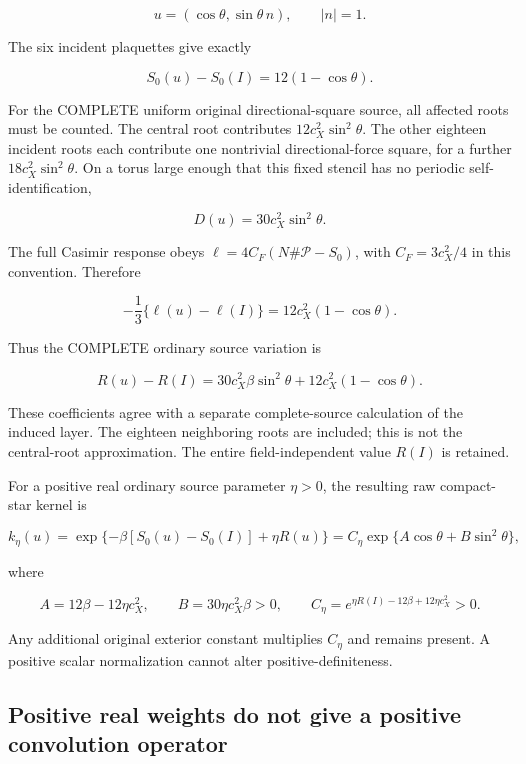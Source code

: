 \documentclass[
  11pt,
]{article}
\begin{document}
\[
 u=(\cos\theta,\sin\theta\,n),\qquad |n|=1.
\]

The six incident plaquettes give exactly

\[
 S_0(u)-S_0(I)=12(1-\cos\theta).
 \tag{T1}
\]

For the COMPLETE uniform original directional-square source, all
affected roots must be counted. The central root contributes
\(12c_X^2\sin^2\theta\). The other eighteen incident roots each
contribute one nontrivial directional-force square, for a further
\(18c_X^2\sin^2\theta\). On a torus large enough that this fixed stencil
has no periodic self-identification,

\[
 D(u)=30c_X^2\sin^2\theta.
 \tag{T2}
\]

The full Casimir response obeys \(\ell=4C_F(N\#\mathcal P-S_0)\), with
\(C_F=3c_X^2/4\) in this convention. Therefore

\[
 -\frac13\{\ell(u)-\ell(I)\}
 =12c_X^2(1-\cos\theta).
 \tag{T3}
\]

Thus the COMPLETE ordinary source variation is

\[
 R(u)-R(I)
 =30c_X^2\beta\sin^2\theta
   +12c_X^2(1-\cos\theta).
 \tag{T4}
\]

These coefficients agree with a separate
complete-source calculation of the induced layer. The eighteen
neighboring roots are included; this is not the central-root
approximation. The entire field-independent value \(R(I)\) is retained.

For a positive real ordinary source parameter \(\eta>0\), the resulting
raw compact-star kernel is

\[
 k_\eta(u)
 =\exp\{-\beta[S_0(u)-S_0(I)]+\eta R(u)\}
 =C_\eta\exp\{A\cos\theta+B\sin^2\theta\},
 \tag{T5}
\]

where

\[
 A=12\beta-12\eta c_X^2,
 \qquad B=30\eta c_X^2\beta>0,
 \qquad C_\eta=e^{\eta R(I)-12\beta+12\eta c_X^2}>0.
 \tag{T6}
\]

Any additional original exterior constant multiplies \(C_\eta\) and
remains present. A positive scalar normalization cannot alter
positive-definiteness.

\hypertarget{positive-real-weights-do-not-give-a-positive-convolution-operator}{%
\subsection{Positive real weights do not give a positive convolution
operator}\label{positive-real-weights-do-not-give-a-positive-convolution-operator}}
\end{document}
